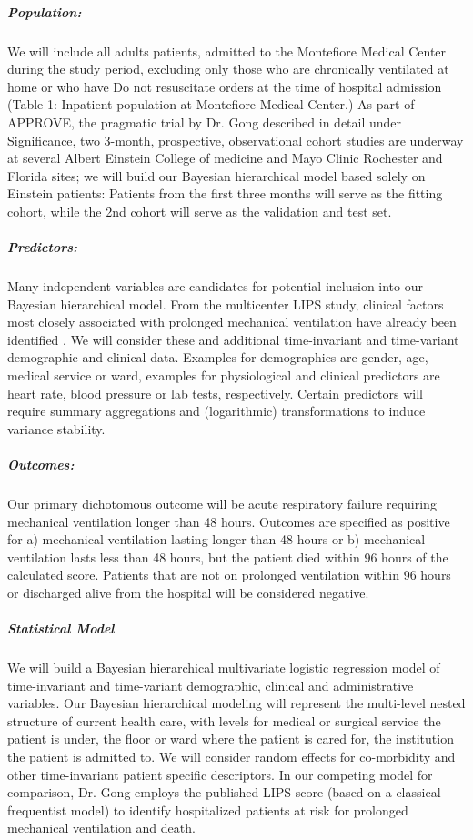 \documentclass[11pt,notitlepage]{article}
\begin{document}
\subparagraph*{Population:}
We will include all adults patients, admitted to the Montefiore Medical Center during the study period, excluding only those who are chronically ventilated at home or who have Do not resuscitate orders at the time of hospital admission (Table 1: Inpatient population at Montefiore Medical Center.) As part of APPROVE, the pragmatic trial by Dr. Gong described in detail under Significance, two 3-month, prospective, observational cohort studies are underway at several Albert Einstein College of medicine and Mayo Clinic Rochester and Florida sites; we will build our Bayesian hierarchical model based solely on Einstein patients: Patients from the first three months will serve as the fitting cohort, while the 2nd cohort will serve as the validation and test set.  

\subparagraph*{Predictors:}
Many independent variables are candidates for potential inclusion into our Bayesian hierarchical model. From the multicenter LIPS study, clinical factors most closely associated with prolonged mechanical ventilation have already been identified \cite{Herridge_12594312}. We will consider these and additional time-invariant and time-variant demographic and clinical data. Examples for demographics are gender, age, medical service or ward, examples for physiological and clinical predictors are heart rate, blood pressure or lab tests, respectively. Certain predictors will require summary aggregations and (logarithmic) transformations to induce variance stability.

\subparagraph*{Outcomes:}
Our primary dichotomous outcome will be acute respiratory failure requiring mechanical ventilation longer than 48 hours. Outcomes are specified as positive for a) mechanical ventilation lasting longer than 48 hours or b) mechanical ventilation lasts less than 48 hours, but the patient died within 96 hours of the calculated score. Patients that are not on prolonged ventilation within 96 hours or discharged alive from the hospital will be considered negative.

\subparagraph*{Statistical Model}
 We will build a Bayesian hierarchical multivariate logistic regression model of time-invariant and time-variant demographic, clinical and administrative variables. Our Bayesian hierarchical modeling will represent the multi-level nested structure of current health care, with levels for medical or surgical service the patient is under, the floor or ward where the patient is cared for, the institution the patient is admitted to. We will consider random effects for co-morbidity and other time-invariant patient specific descriptors. In our competing model for comparison, Dr. Gong employs the published LIPS score \cite{Herridge_12594312} (based on a classical frequentist model) to identify hospitalized patients at risk for prolonged mechanical ventilation and death.
\end{document}
